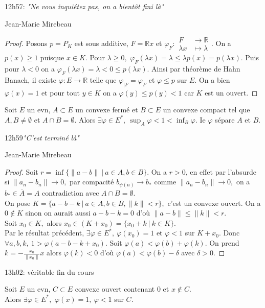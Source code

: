 \epigraph{12h57: \itshape "Ne vous inquiétez pas, on a bientôt fini là"}{Jean-Marie Mirebeau}
\begin{proof}
    Posons $p=P_K$ est sous additive, $F=\mathbb{R} x$ et $\varphi _F :\begin{aligned}
        F &\longrightarrow \mathbb{R}  \\
        \lambda x &\longmapsto \lambda
    \end{aligned}$. On a $p(x)\ge  1$ puisque $x\in K.$ Pour $\lambda\ge 0,$ $\varphi _F(\lambda x)=\lambda\le \lambda p(x) = p(\lambda x).$ Puis pour $\lambda<0$ on a $\varphi _F(\lambda x)=\lambda < 0 \le p(\lambda x).$ Ainsi par théorème de Hahn Banach, il existe $\varphi :E\to \mathbb{R} $ telle que $\varphi _{|F}=\varphi _F$ et $\varphi \le p$ sur $E$. On a bien $\varphi (x)=1$ et pour tout $y\in K$ on a $\varphi (y)\le p(y)<1$ car $K$ est un ouvert.
\end{proof}
\begin{theoreme}
    Soit $E$ un evn, $A\subset E$ un convexe fermé et $B\subset E$ un convexe compact tel que $A,B\neq \emptyset $ et $A\cap B=\emptyset .$ Alors $\exists \varphi \in E^*,\ \sup_A\varphi <1<\inf_B\varphi $. Ie $\varphi $ sépare $A$ et $B$.
\end{theoreme}
\epigraph{12h59\itshape "C'est terminé là"}{Jean-Marie Mirebeau}
\begin{proof}
    Soit $r=\inf \{\|a-b\| ~|~ a\in A, b\in B\} $. On a $r>0$, en effet par l'absurde si $\|a_n-b_n\|\to 0,$ par compacité $b_{\psi (n)}\to b_*$ comme $\|a_n-b_n\|\to 0,$ on a $b_*\in \overline{A}=A$ contradiction avec $A\cap B=\emptyset .$ \\
    On pose $K=\{a-b-k\ |\ a\in A,b\in B, \|k\|<r\} ,$ c'est un convexe ouvert. On a $0\not\in K$ sinon on aurait aussi $a-b-k=0$ d'où $\|a-b\|\le \|k\|<r$.\\
    Soit $x_0\in K,$ alors $x_0\in \left( K+x_0 \right) =\{x_0+k\ |\ k\in K\} .$\\
    Par le résultat précédent, $\exists \varphi \in E^*,\ \varphi (x_0)=1$ et $\varphi <1$ sur $K+x_0$. Donc $\forall a,b,k,\ 1>\varphi (a-b-k+x_0). $ Soit $\varphi (a)<\varphi (b)+\varphi (k).$ On prend $k=-\frac{x_0}{\|x_0\|}x$ alors $\varphi (k)<0$ d'où $\varphi (a)<\varphi (b)-\delta$ avec $\delta>0.$
\end{proof}
\epigraph{13h02: véritable fin du cours}{}


\begin{theoreme}
    Soit $E$ un evn, $C \subset E$ convexe ouvert contenant 0 et $x\not\in C.$ \\
    Alors $\exists \varphi \in E^*, $ $\varphi (x)=1,~\varphi <1$ sur $C.$
\end{theoreme}

